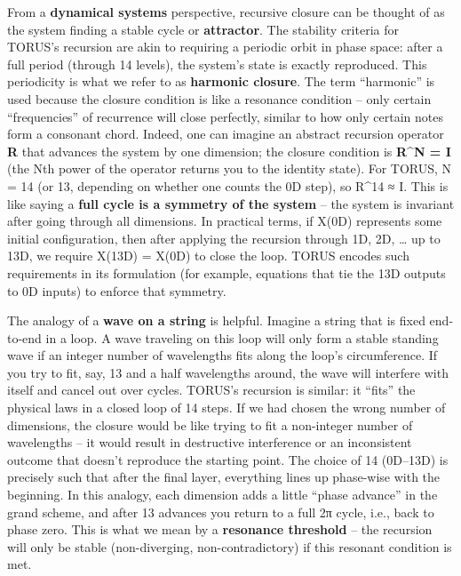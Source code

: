 \documentclass[
]{article}
\begin{document}
From a \textbf{dynamical systems} perspective, recursive closure can be
thought of as the system finding a stable cycle or \textbf{attractor}.
The stability criteria for TORUS's recursion are akin to requiring a
periodic orbit in phase space: after a full period (through 14 levels),
the system's state is exactly reproduced. This periodicity is what we
refer to as \textbf{harmonic closure}. The term ``harmonic'' is used
because the closure condition is like a resonance condition -- only
certain ``frequencies'' of recurrence will close perfectly, similar to
how only certain notes form a consonant chord. Indeed, one can imagine
an abstract recursion operator \textbf{R} that advances the system by
one dimension; the closure condition is \textbf{R\^{}N = I} (the Nth
power of the operator returns you to the identity state)\hspace{0pt}.
For TORUS, N = 14 (or 13, depending on whether one counts the 0D step),
so R\^{}14 ≈ I. This is like saying a \textbf{full cycle is a symmetry
of the system} -- the system is invariant after going through all
dimensions. In practical terms, if X(0D) represents some initial
configuration, then after applying the recursion through 1D, 2D,
\ldots{} up to 13D, we require X(13D) = X(0D) to close the
loop\hspace{0pt}. TORUS encodes such requirements in its formulation
(for example, equations that tie the 13D outputs to 0D inputs) to
enforce that symmetry.

The analogy of a \textbf{wave on a string} is helpful. Imagine a string
that is fixed end-to-end in a loop. A wave traveling on this loop will
only form a stable standing wave if an integer number of wavelengths
fits along the loop's circumference. If you try to fit, say, 13 and a
half wavelengths around, the wave will interfere with itself and cancel
out over cycles. TORUS's recursion is similar: it ``fits'' the physical
laws in a closed loop of 14 steps. If we had chosen the wrong number of
dimensions, the closure would be like trying to fit a non-integer number
of wavelengths -- it would result in destructive interference or an
inconsistent outcome that doesn't reproduce the starting
point\hspace{0pt}. The choice of 14 (0D--13D) is precisely such that
after the final layer, everything lines up phase-wise with the
beginning. In this analogy, each dimension adds a little ``phase
advance'' in the grand scheme, and after 13 advances you return to a
full 2π cycle, i.e., back to phase zero\hspace{0pt}. This is what we
mean by a \textbf{resonance threshold} -- the recursion will only be
stable (non-diverging, non-contradictory) if this resonant condition is
met.
\end{document}

